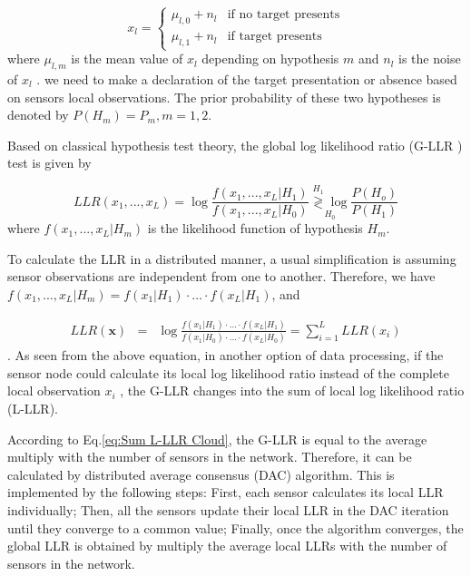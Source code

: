 \begin{equation}
x_{l}=\begin{cases}
\mu_{l,0}+n_{l} & \mbox{if no target presents}\\
\mu_{l,1}+n_{l} & \mbox{if target presents}
\end{cases}
\end{equation}
where $\mu_{l,m}$ is the mean value of $x_{l}$ depending on hypothesis
$m$ and $n_{l}$ is the noise of $x_{l}$ . we need to make a declaration
of the target presentation or absence based on sensors local observations.
The prior probability of these two hypotheses is denoted by $P\left(H_{m}\right)=P_{m},m=1,2$.

Based on classical hypothesis test theory, the global log likelihood
ratio (G-LLR ) test is given by 

\begin{equation}
LLR(x_{1},...,x_{L})=\log\frac{f\left(x_{1},...,x_{L}|H_{1}\right)}{f\left(x_{1},...,x_{L}|H_{0}\right)}\underset{H_{0}}{\overset{H_{1}}{\gtrless}\log}\frac{P\left(H_{o}\right)}{P\left(H_{1}\right)}\label{eq:G-LLR define}
\end{equation}
where $f\left(x_{1},...,x_{L}|H_{m}\right)$ is the likelihood function
of hypothesis $H_{m}$.

To calculate the LLR in a distributed manner, a usual simplification
is assuming sensor observations are independent from one to another.
Therefore, we have $f\left(x_{1},...,x_{L}|H_{m}\right)=f\left(x_{1}|H_{1}\right)\cdot\ldots\cdot f\left(x_{L}|H_{1}\right)$,
and 

\begin{eqnarray}
LLR(\mathbf{x}) & = & \log\frac{f\left(x_{1}|H_{1}\right)\cdot\ldots\cdot f\left(x_{L}|H_{1}\right)}{f\left(x_{1}|H_{0}\right)\cdot\ldots\cdot f\left(x_{L}|H_{0}\right)}=\sum_{i=1}^{L}LLR\left(x_{i}\right)\label{eq:Sum L-LLR}
\end{eqnarray}
. As seen from the above equation, in another option of data processing,
if the sensor node could calculate its local log likelihood ratio
instead of the complete local observation $x_{i}$ , the G-LLR changes
into the sum of local log likelihood ratio (L-LLR). 

According to Eq.\ref{eq:Sum L-LLR Cloud}, the G-LLR is equal to the
average multiply with the number of sensors in the network. Therefore,
it can be calculated by distributed average consensus (DAC) algorithm.
This is implemented by the following steps: First, each sensor calculates
its local LLR individually; Then, all the sensors update their local
LLR in the DAC iteration until they converge to a common value; Finally,
once the algorithm converges, the global LLR is obtained by multiply
the average local LLRs with the number of sensors in the network. 

